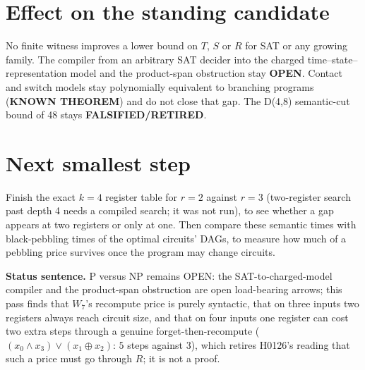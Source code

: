 \documentclass[11pt]{article}
\begin{document}
\section*{Effect on the standing candidate}
No finite witness improves a lower bound on $T$, $S$ or $R$ for SAT or any growing family. The compiler from an arbitrary SAT decider into the charged time--state--representation model and the product-span obstruction stay \textbf{OPEN}. Contact and switch models stay polynomially equivalent to branching programs (\textbf{KNOWN THEOREM}) and do not close that gap. The D(4,8) semantic-cut bound of 48 stays \textbf{FALSIFIED/RETIRED}.

\section*{Next smallest step}
Finish the exact $k=4$ register table for $r=2$ against $r=3$ (two-register search past depth 4 needs a compiled search; it was not run), to see whether a gap appears at two registers or only at one. Then compare these semantic times with black-pebbling times of the optimal circuits' DAGs, to measure how much of a pebbling price survives once the program may change circuits.

\bigskip
\noindent\textbf{Status sentence.} P versus NP remains OPEN: the SAT-to-charged-model compiler and the product-span obstruction are open load-bearing arrows; this pass finds that $W_7$'s recompute price is purely syntactic, that on three inputs two registers always reach circuit size, and that on four inputs one register can cost two extra steps through a genuine forget-then-recompute ($(x_0\wedge x_3)\vee(x_1\oplus x_2)$: $5$ steps against $3$), which retires H0126's reading that such a price must go through $R$; it is not a proof.
\end{document}
